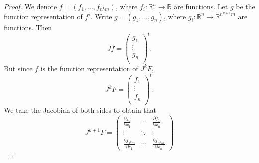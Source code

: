 \documentclass{article}
\theoremstyle{plain} %
\numberwithin{thm}{section} %
\theoremstyle{definition}
\begin{document}
    \begin{proof}
        We denote \(f = (f_1, ..., f_{n^k m})\), where \(f_i : \mathbb{R}^n \to \mathbb{R}\) are functions. Let \(g\) be the function representation of \(f'\). Write \(g = (g_1, ..., g_n)\), where \(g_i : \mathbb{R}^n \to \mathbb{R}^{n^{k+1}m}\) are functions. Then
        \[
            Jf = \begin{pmatrix}
                 g_1 \\
                 \vdots \\
                 g_n \\
            \end{pmatrix}^t.
        \]
        But since \(f\) is the function representation of \(J^k F\),
        \[
            J^k F = \begin{pmatrix}
                 f_1 \\
                 \vdots \\
                 f_n \\
            \end{pmatrix}^t.
        \]
        We take the Jacobian of both sides to obtain that
        \[
            J^{k+1} F = \begin{pmatrix}
                \frac{\partial f_{1}}{\partial x_1} & \cdots & \frac{\partial f_{1}}{\partial x_n} \\
                \vdots & \ddots & \vdots \\
                \frac{\partial f_{n^{k}m}}{\partial x_1} & \cdots & \frac{\partial f_{n^k m}}{\partial x_n}
            \end{pmatrix}
        \]
    \end{proof}
\end{document}
